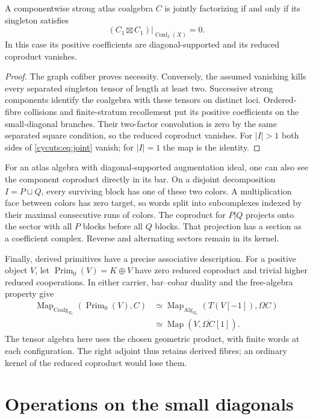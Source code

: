 \begin{corollary}\label{cycuts:cor:intersection}
A componentwise strong atlas coalgebra $C$ is jointly factorizing
if and only if its singleton satisfies
\[
 (C_1\boxtimes C_1)|_{\operatorname{Conf}_2(X)}=0.
\]
In this case its positive coefficients are diagonal-supported and
its reduced coproduct vanishes.
\end{corollary}
\begin{proof}
The graph cofiber proves necessity. Conversely, the assumed vanishing
kills every separated singleton tensor of length at least two.
Successive strong components identify the coalgebra with these tensors
on distinct loci. Ordered-fibre collisions and finite-stratum
recollement put its positive coefficients on the small-diagonal
branches. Their two-factor convolution is zero by the same separated
square condition, so the reduced coproduct vanishes. For $|I|>1$
both sides of \eqref{cycuts:eq:joint} vanish; for $|I|=1$ the map
is the identity.
\end{proof}

For an atlas algebra with diagonal-supported augmentation ideal,
one can also see the component coproduct directly in its bar.
On a disjoint decomposition $I=P\sqcup Q$, every surviving block
has one of these two colors. A multiplication face between colors
has zero target, so words split into subcomplexes indexed by their
maximal consecutive runs of colors. The coproduct for $P|Q$
projects onto the sector with all $P$ blocks before all $Q$ blocks.
That projection has a section as a coefficient complex. Reverse
and alternating sectors remain in its kernel.

Finally, derived primitives have a precise associative description.
For a positive object $V$, let $\operatorname{Prim}_0(V)=K\oplus V$
have zero reduced coproduct and trivial higher reduced cooperations.
In either carrier, bar--cobar duality and the free-algebra property give
\[
 \begin{aligned}
 \operatorname{Map}_{\mathrm{Coalg}_{E_1}}
       (\operatorname{Prim}_0(V),C)
 &\simeq\operatorname{Map}_{\mathrm{Alg}_{E_1}}
       (T(V[-1]),\Omega C)\\
 &\simeq\operatorname{Map}(V,\overline{\Omega C}[1]).
 \end{aligned}
\]
The tensor algebra here uses the chosen geometric product, with
finite words at each configuration. The right adjoint thus retains
derived fibres; an ordinary kernel of the reduced coproduct would
lose them.

\section{Operations on the small diagonals}
\label{cycuts:sec:operations}

